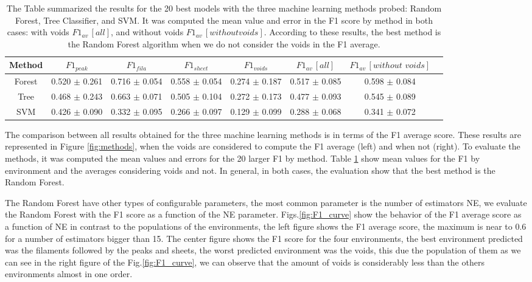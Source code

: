\documentclass[usenatbib]{mnras}
\begin{document}
\begin{table}
\centering
\begin{tabular}{cccccccc}
\hline
 Method   & $F1_{peak}$     & $F1_{fila}$     & $F1_{sheet}$    & $F1_{voids}$    & $F1_{av}\,[all]$   & $F1_{av}\,[without \,\,voids]$   \\
\hline
 Forest   & 0.520 $\pm$ 0.261  & 0.716 $\pm$ 0.054 & 0.558 $\pm$ 0.054 & 0.274 $\pm$ 0.187 & 0.517 $\pm$ 0.085  & 0.598 $\pm$ 0.084 \\
 Tree     & 0.468 $\pm$ 0.243 & 0.663 $\pm$ 0.071 & 0.505 $\pm$ 0.104 & 0.272 $\pm$ 0.173 & 0.477 $\pm$ 0.093 & 0.545 $\pm$ 0.089  \\
 SVM      & 0.426 $\pm$ 0.090  & 0.332 $\pm$ 0.095 & 0.266 $\pm$ 0.097 & 0.129 $\pm$ 0.099 & 0.288 $\pm$ 0.068 & 0.341 $\pm$ 0.072   \\
\hline
\end{tabular}
\caption{The Table summarized the results for the 20 best models with the three machine learning methods probed: Random Forest, Tree Classifier, and SVM. It was computed the mean value and error in the F1 score by method in both cases: with voids $F1_{av}\,[all]$, and without voids $F1_{av}\,[without voids]$. According to these results, the best method is the Random Forest algorithm when we do not consider the voids in the F1 average.}
\label{tab:methods}
\end{table}

The comparison between all results obtained for the three machine learning methods is in terms of the F1 average score. These results are represented in Figure \ref{fig:methods}, when the voids are considered to compute the F1 average (left) and when not (right). 
To evaluate the methods, it was computed the mean values and errors for the 20 larger F1 by method. Table \ref{tab:methods} show mean values for the F1 by environment and the averages considering voids and not.
In general, in both cases, the evaluation show that the best method is the Random Forest. 

The Random Forest have other types of configurable parameters, the most common parameter is the number of estimators NE, we evaluate the Random Forest with the F1 score as a function of the NE parameter. 
Figs.\ref{fig:F1_curve} show the behavior of the F1 average score as a function of NE in contrast to the populations of the environments,
the left figure shows the F1 average score,
the maximum is near to 0.6 for a number of estimators bigger than 15.
The center figure shows the F1 score for the four environments,
the best environment predicted was the filaments followed by the peaks and sheets,
the worst predicted environment was the voids,
this due the population of them as we can see in the right figure of the Fig.\ref{fig:F1_curve},
we can observe that the amount of voids is considerably less than the others environments almost in one order.
\end{document}
